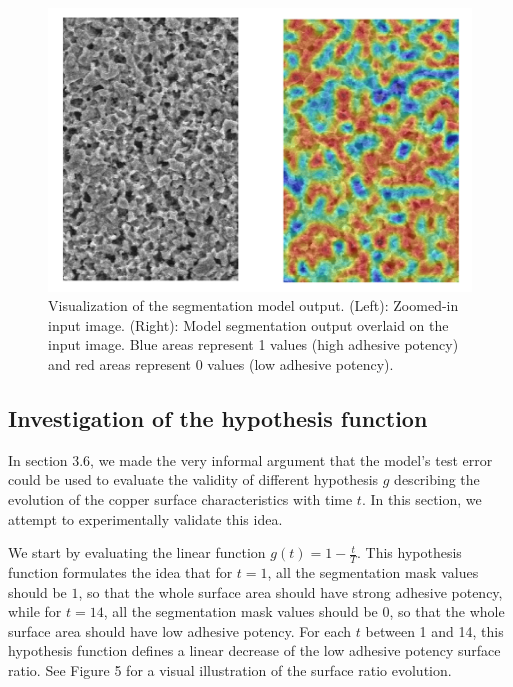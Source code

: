 \documentclass[10pt,twocolumn,letterpaper]{article}
\begin{document}
\begin{figure}[h]
\centering
\includegraphics[width=0.9\linewidth]{"./figures/Figure9"}
\caption{
Visualization of the segmentation model output.
(Left): Zoomed-in input image.
(Right): Model segmentation output overlaid on the input image.
Blue areas represent 1 values (high adhesive potency) 
and red areas represent 0 values (low adhesive potency).
}
\end{figure}

\subsection{Investigation of the hypothesis function}
In section 3.6, we made the very informal argument that the model's test error could be used
to evaluate the validity of different hypothesis $g$ describing the evolution of
the copper surface characteristics with time $t$. 
In this section, we attempt to experimentally validate this idea.

We start by evaluating the linear function $g(t)=1 - \frac{t}{T}$.
This hypothesis function formulates the idea that for $t=1$, 
all the  segmentation mask values should be $1$, 
so that the whole surface area should have strong adhesive potency, 
while for $t=14$, all the segmentation mask values should be $0$, so that 
the whole surface area should have low adhesive potency.
For each $t$ between 1 and 14, this hypothesis function defines a linear decrease
of the low adhesive potency surface ratio.
See Figure 5 for a visual illustration of the surface ratio evolution.
\end{document}
